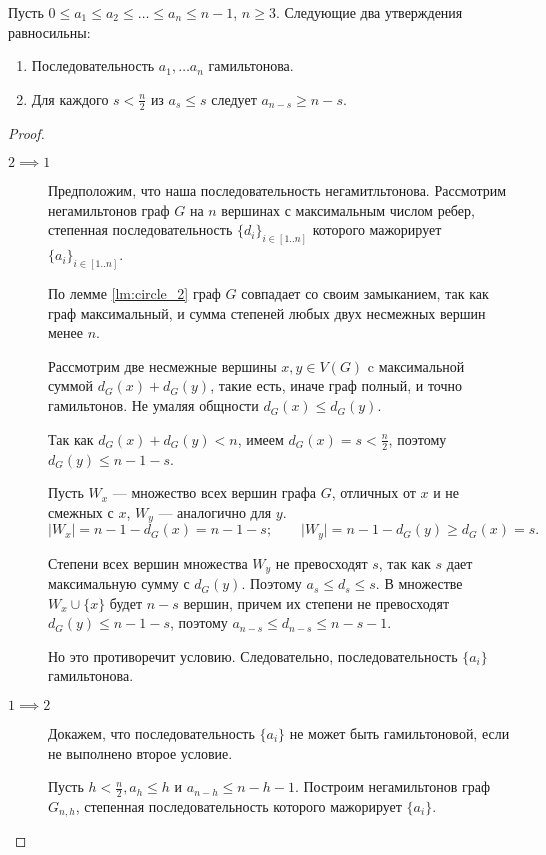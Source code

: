 \begin{theorem}
    Пусть $0 \le a_1 \le a_2 \le \ldots \le a_n \le n-1$, $n \ge 3$. Следующие два утверждения равносильны:
	\begin{enumerate}
		\item Последовательность $a_1, \ldots a_n $ гамильтонова.
		\item Для каждого $s < \frac{n}{2}$ из $a_s \le s$ следует $a_{n-s} \ge  n-s$.
	\end{enumerate}
\end{theorem}
\begin{proof}
	\begin{description}
		\item[$2 \implies 1$] Предположим, что наша последовательность негамитльтонова. Рассмотрим негамильтонов граф $G$ на $n$ вершинах с максимальным числом ребер, степенная последовательность $\{d_i\}_{i \in [1..n]}$ которого мажорирует $\{a_i\}_{i \in [1..n]}$. 

			По лемме \ref{lm:circle_2} граф $G$ совпадает со своим замыканием, так как граф максимальный, и сумма степеней любых двух несмежных вершин менее $n$.

			Рассмотрим две несмежные вершины $x, y \in V(G)$ c максимальной суммой $d_G(x) + d_G(y)$, такие есть, иначе граф полный, и точно гамильтонов. Не умаляя общности $d_G(x) \le d_G(y)$.

			Так как $d_G(x) + d_G(y) < n$, имеем $d_G(x) = s < \frac{n}{2}$, поэтому $d_G(y) \le n-1 -s$.

			Пусть $W_x$ --- множество всех вершин графа $G$, отличных от $x$ и не смежных с $x$, $W_y$ --- аналогично для $y$.
			\[
			\lvert W_x \rvert = n-1-d_G(x) = n-1-s; \qquad \lvert W_y \rvert = n-1-d_G(y) \ge d_G(x) = s
			.\] 

			Степени всех вершин множества $W_y$ не превосходят $s $, так как $s$ дает максимальную сумму с $d_G(y)$. Поэтому  $a_s \le d_s \le s$. В множестве $W_x \cup \{x\}$ будет $n-s$ вершин, причем их степени не превосходят $d_G(y) \le n-1-s$, поэтому $a_{n-s} \le d_{n-s} \le n-s-1$.

			Но это противоречит условию. Следовательно, последовательность $\{a_i\}$ гамильтонова.
		\item[$1 \implies 2$] Докажем, что последовательность  $\{a_i\}$ не может быть гамильтоновой, если не выполнено второе условие.
			
			Пусть $h < \frac{n}{2}, a_h \le h$ и $a_{n-h} \le n - h -1$. Построим негамильтонов граф $G_{n, h}$, степенная последовательность которого мажорирует $\{a_i\}$.


\end{description}
\end{proof}
